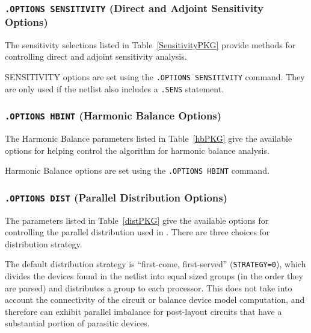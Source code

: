 {{

\subsubsection{\texttt{.OPTIONS SENSITIVITY} (Direct and Adjoint Sensitivity Options)}

The sensitivity selections listed in Table~\ref{SensitivityPKG}
provide methods for controlling direct and adjoint sensitivity analysis.

SENSITIVITY options are set using the \texttt{.OPTIONS SENSITIVITY} command. 
They are only used if the netlist also includes a \texttt{.SENS} statement. 



\subsubsection{\texttt{.OPTIONS HBINT} (Harmonic Balance Options)}

The Harmonic Balance parameters listed in Table~\ref{hbPKG} give the available
options for helping control the algorithm for harmonic balance analysis.

Harmonic Balance options are set using the \texttt{.OPTIONS HBINT} command.



\subsubsection{\texttt{.OPTIONS DIST} (Parallel Distribution Options)}

The parameters listed in Table~\ref{distPKG} give the available
options for controlling the parallel distribution used in \Xyce{}.
There are three choices for distribution strategy.

The default distribution strategy is ``first-come, first-served''
(\texttt{STRATEGY=0}), which divides the devices found in the netlist
into equal sized groups (in the order they are parsed) and distributes
a group to each processor.  This does not take into account the
connectivity of the circuit or balance device model computation, and
therefore can exhibit parallel imbalance for post-layout circuits that
have a substantial portion of parasitic devices.

}}
